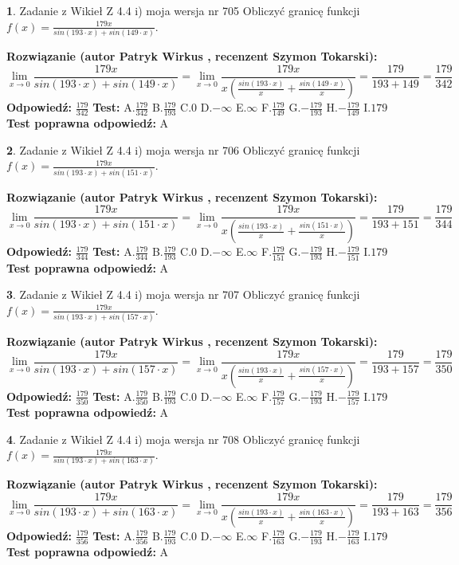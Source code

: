 \documentclass[12pt, a4paper]{article}
\theoremstyle{definition} %
\newtheorem{zad}{}
\newcommand{\zadStart}[1]{\begin{zad}#1\newline}
\newcommand{\zadStop}{\end{zad}}
\newcommand{\rozwStart}[2]{\noindent \textbf{Rozwiązanie (autor #1 , recenzent #2): }\newline}
\newcommand{\rozwStop}{\newline}
\newcommand{\odpStart}{\noindent \textbf{Odpowiedź:}\newline}
\newcommand{\odpStop}{\newline}
\newcommand{\testStart}{\noindent \textbf{Test:}\newline}
\newcommand{\testStop}{\newline}
\newcommand{\kluczStart}{\noindent \textbf{Test poprawna odpowiedź:}\newline}
\newcommand{\kluczStop}{\newline}
\begin{document}
\zadStart{Zadanie z Wikieł Z 4.4 i) moja wersja nr 705}
Obliczyć granicę funkcji $f(x)=\frac{179x}{sin(193\cdot x) +sin(149\cdot x)}$.
\zadStop
\rozwStart{Patryk Wirkus}{Szymon Tokarski}
$$\lim\limits_{x\to 0}\frac{179x}{sin(193\cdot x) +sin(149\cdot x)}=\lim\limits_{x\to 0}\frac{179x}{x(\frac{sin(193\cdot x)}{x}+\frac{sin(149\cdot x)}{x})}=\frac{179}{193+149} = \frac{179}{342}$$
\rozwStop
\odpStart
$\frac{179}{342}$
\odpStop
\testStart
A.$\frac{179}{342}$
B.$\frac{179}{193}$
C.$0$
D.$-\infty$
E.$\infty$
F.$\frac{179}{149}$
G.$-\frac{179}{193}$
H.$-\frac{179}{149}$
I.$179$
\testStop
\kluczStart
A
\kluczStop



\zadStart{Zadanie z Wikieł Z 4.4 i) moja wersja nr 706}
Obliczyć granicę funkcji $f(x)=\frac{179x}{sin(193\cdot x) +sin(151\cdot x)}$.
\zadStop
\rozwStart{Patryk Wirkus}{Szymon Tokarski}
$$\lim\limits_{x\to 0}\frac{179x}{sin(193\cdot x) +sin(151\cdot x)}=\lim\limits_{x\to 0}\frac{179x}{x(\frac{sin(193\cdot x)}{x}+\frac{sin(151\cdot x)}{x})}=\frac{179}{193+151} = \frac{179}{344}$$
\rozwStop
\odpStart
$\frac{179}{344}$
\odpStop
\testStart
A.$\frac{179}{344}$
B.$\frac{179}{193}$
C.$0$
D.$-\infty$
E.$\infty$
F.$\frac{179}{151}$
G.$-\frac{179}{193}$
H.$-\frac{179}{151}$
I.$179$
\testStop
\kluczStart
A
\kluczStop



\zadStart{Zadanie z Wikieł Z 4.4 i) moja wersja nr 707}
Obliczyć granicę funkcji $f(x)=\frac{179x}{sin(193\cdot x) +sin(157\cdot x)}$.
\zadStop
\rozwStart{Patryk Wirkus}{Szymon Tokarski}
$$\lim\limits_{x\to 0}\frac{179x}{sin(193\cdot x) +sin(157\cdot x)}=\lim\limits_{x\to 0}\frac{179x}{x(\frac{sin(193\cdot x)}{x}+\frac{sin(157\cdot x)}{x})}=\frac{179}{193+157} = \frac{179}{350}$$
\rozwStop
\odpStart
$\frac{179}{350}$
\odpStop
\testStart
A.$\frac{179}{350}$
B.$\frac{179}{193}$
C.$0$
D.$-\infty$
E.$\infty$
F.$\frac{179}{157}$
G.$-\frac{179}{193}$
H.$-\frac{179}{157}$
I.$179$
\testStop
\kluczStart
A
\kluczStop



\zadStart{Zadanie z Wikieł Z 4.4 i) moja wersja nr 708}
Obliczyć granicę funkcji $f(x)=\frac{179x}{sin(193\cdot x) +sin(163\cdot x)}$.
\zadStop
\rozwStart{Patryk Wirkus}{Szymon Tokarski}
$$\lim\limits_{x\to 0}\frac{179x}{sin(193\cdot x) +sin(163\cdot x)}=\lim\limits_{x\to 0}\frac{179x}{x(\frac{sin(193\cdot x)}{x}+\frac{sin(163\cdot x)}{x})}=\frac{179}{193+163} = \frac{179}{356}$$
\rozwStop
\odpStart
$\frac{179}{356}$
\odpStop
\testStart
A.$\frac{179}{356}$
B.$\frac{179}{193}$
C.$0$
D.$-\infty$
E.$\infty$
F.$\frac{179}{163}$
G.$-\frac{179}{193}$
H.$-\frac{179}{163}$
I.$179$
\testStop
\kluczStart
A
\kluczStop
\end{document}
